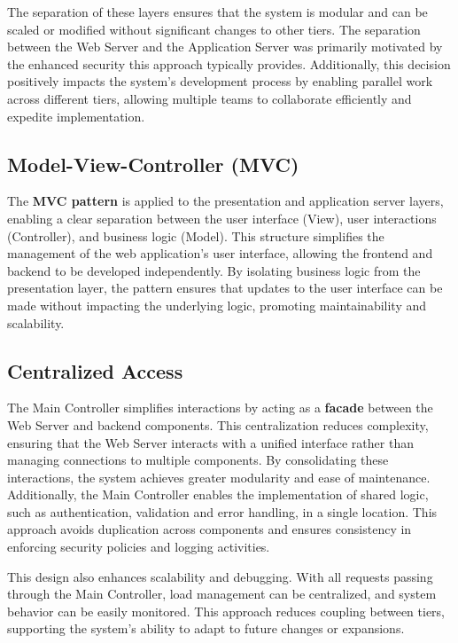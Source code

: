 The separation of these layers ensures that the system is modular and can be scaled or modified without significant changes to other tiers. The separation between the Web Server and the Application Server was primarily motivated by the enhanced security this approach typically provides. Additionally, this decision positively impacts the system's development process by enabling parallel work across different tiers, allowing multiple teams to collaborate efficiently and expedite implementation.

\subsection{Model-View-Controller (MVC)}
\label{subsec:mvc}%

The \textbf{MVC pattern} is applied to the presentation and application server layers, enabling a clear separation between the user interface (View), user interactions (Controller), and business logic (Model). This structure simplifies the management of the web application’s user interface, allowing the frontend and backend to be developed independently. By isolating business logic from the presentation layer, the pattern ensures that updates to the user interface can be made without impacting the underlying logic, promoting maintainability and scalability.

\subsection{Centralized Access}
\label{subsec:centralized_access}%

The Main Controller simplifies interactions by acting as a \textbf{facade} between the Web Server and backend components. This centralization reduces complexity, ensuring that the Web Server interacts with a unified interface rather than managing connections to multiple components. By consolidating these interactions, the system achieves greater modularity and ease of maintenance. Additionally, the Main Controller enables the implementation of shared logic, such as authentication, validation and error handling, in a single location. This approach avoids duplication across components and ensures consistency in enforcing security policies and logging activities. 

This design also enhances scalability and debugging. With all requests passing through the Main Controller, load management can be centralized, and system behavior can be easily monitored. This approach reduces coupling between tiers, supporting the system's ability to adapt to future changes or expansions.

